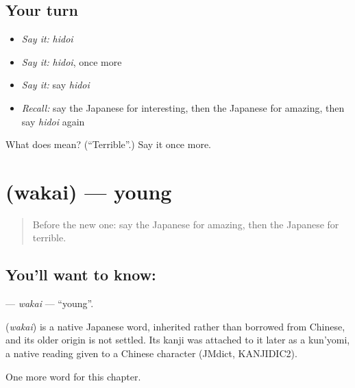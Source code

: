 \subsection*{Your turn}
\begin{itemize}
\raggedright
  \item \emph{Say it:} \emph{hidoi}
  \item \emph{Say it:} \emph{hidoi}, once more
  \item \emph{Say it:} say \emph{hidoi}
  \item \emph{Recall:} say the Japanese for interesting, then the Japanese for amazing, then say \emph{hidoi} again
\end{itemize}

\begin{tcolorbox}[breakable,colback=teal!4,colframe=teal!35!black,title={Before you move on}]
What does  mean? (\textquotedblleft{}Terrible\textquotedblright{}.) Say it once more.
\end{tcolorbox}
\section[\texorpdfstring{\ja{わかい} (wakai)}{わかい (wakai)}]{ (wakai) — young}

\label{lesson:JA-C125-wakai}



\begin{quote}
Before the new one: say the Japanese for amazing, then the Japanese for terrible.
\end{quote}

\subsection*{You'll want to know: }
\textbf{} — \emph{wakai} — \textquotedblleft{}young\textquotedblright{}.

\begin{cousinweb}
\textbf{} (\emph{wakai}) is a native Japanese word, inherited rather than borrowed from Chinese, and its older origin is not settled. Its kanji was attached to it later as a kun'yomi, a native reading given to a Chinese character (JMdict, KANJIDIC2).
\end{cousinweb}

\begin{grammarlens}[title={What you've built}]
One more word for this chapter.
\end{grammarlens}

